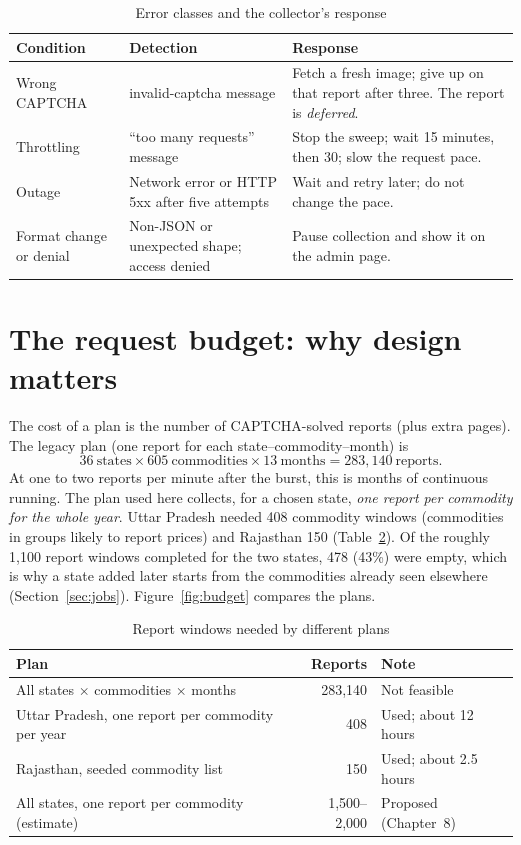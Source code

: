 \documentclass[12pt,a4paper,oneside]{report}
\numberwithin{equation}{chapter}
\numberwithin{figure}{chapter}
\numberwithin{table}{chapter}
\theoremstyle{definition}
\begin{document}
\begin{table}[H]
\centering
\caption{Error classes and the collector's response}
\label{tab:errors}
\small
\begin{tabular}{@{}p{}p{}p{}@{}}
\toprule
Condition & Detection & Response \\
\midrule
Wrong CAPTCHA & invalid-captcha message & Fetch a fresh image; give up on that report after three. The report is \emph{deferred}. \\
Throttling & ``too many requests'' message & Stop the sweep; wait 15 minutes, then 30; slow the request pace. \\
Outage & Network error or HTTP 5xx after five attempts & Wait and retry later; do not change the pace. \\
Format change or denial & Non-JSON or unexpected shape; access denied & Pause collection and show it on the admin page. \\
\bottomrule
\end{tabular}
\end{table}

\section{The request budget: why design matters}
The cost of a plan is the number of CAPTCHA-solved reports (plus extra pages). The legacy plan (one report for each state--commodity--month) is
\[
  36\ \text{states}\times 605\ \text{commodities}\times 13\ \text{months}=283{,}140\ \text{reports}.
\]
At one to two reports per minute after the burst, this is months of continuous running. The plan used here collects, for a chosen state, \emph{one report per commodity for the whole year}. Uttar Pradesh needed 408 commodity windows (commodities in groups likely to report prices) and Rajasthan 150 (Table~\ref{tab:budget}). Of the roughly 1,100 report windows completed for the two states, 478 (43\%) were empty, which is why a state added later starts from the commodities already seen elsewhere (Section~\ref{sec:jobs}). Figure~\ref{fig:budget} compares the plans.

\begin{table}[H]
\centering
\caption{Report windows needed by different plans}
\label{tab:budget}
\small
\begin{tabular}{@{}p{}rp{}@{}}
\toprule
Plan & Reports & Note \\
\midrule
All states $\times$ commodities $\times$ months & 283,140 & Not feasible \\
Uttar Pradesh, one report per commodity per year & 408 & Used; about 12 hours \\
Rajasthan, seeded commodity list & 150 & Used; about 2.5 hours \\
All states, one report per commodity (estimate) & 1,500--2,000 & Proposed (Chapter~8) \\
\bottomrule
\end{tabular}
\end{table}
\end{document}
